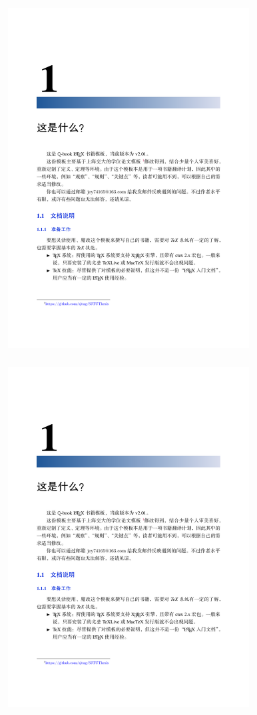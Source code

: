 \documentclass[10pt]{ctexart}
\begin{document}
\clearpage  %


\begin{figure}[t!]
    \vspace{-50pt}  %
    \hspace{-20pt}  %
    \raggedright  %
    \includegraphics[height=9cm]{9.png}  %
    \vspace{-70pt}  %
\end{figure}

\begin{figure}[h!]
    \raggedright  %
    \includegraphics[height=9cm]{9.png}  %
    \vspace{-10pt}  %
\end{figure}
\end{document}
